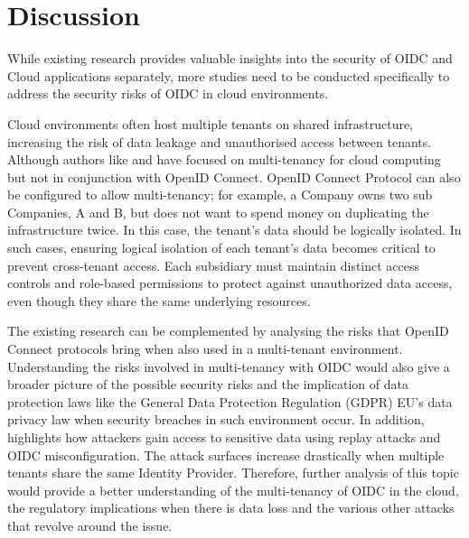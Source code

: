 \section{Discussion}

While existing research provides valuable insights into the security of OIDC and Cloud applications separately, more studies need to be conducted specifically to address the security risks of OIDC in cloud environments. 

Cloud environments often host multiple tenants on shared infrastructure, increasing the risk of data leakage and unauthorised access between tenants. Although authors like \citep{multi_tenancy_cloud_risk} and \citep{cloud_shared_resp} have focused on multi-tenancy for cloud computing but not in conjunction with OpenID Connect. OpenID Connect Protocol can also be configured to allow multi-tenancy; for example, a Company owns two sub Companies, A and B, but does not want to spend money on duplicating the infrastructure twice. In this case, the tenant's data should be logically isolated. In such cases, ensuring logical isolation of each tenant's data becomes critical to prevent cross-tenant access. Each subsidiary must maintain distinct access controls and role-based permissions to protect against unauthorized data access, even though they share the same underlying resources. 

The existing research can be complemented by analysing the risks that OpenID Connect protocols bring when also used in a multi-tenant environment. Understanding the risks involved in multi-tenancy with OIDC would also give a broader picture of the possible security risks and the implication of data protection laws like the General Data Protection Regulation (GDPR) EU's data privacy law \citep{gdpr} when security breaches in such environment occur. In addition, \citep{oidc_attacks} highlights how attackers gain access to sensitive data using replay attacks and OIDC misconfiguration. The attack surfaces increase drastically when multiple tenants share the same Identity Provider. Therefore, further analysis of this topic would provide a better understanding of the multi-tenancy of OIDC in the cloud, the regulatory implications when there is data loss and the various other attacks that revolve around the issue.

